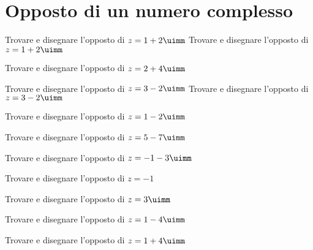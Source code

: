  \section{Opposto di un numero complesso}
 \begin{exercise}
Trovare e disegnare l'opposto di $z=1+2\uimm$
\tcblower
Trovare e disegnare l'opposto di $z=1+2\uimm$
\begin{center}

\label{fig:disegnopianocomplesso03}
\end{center}
 \end{exercise}
 \begin{exercise}[no solution]
 Trovare e disegnare l'opposto di $z=2+4\uimm$
 \end{exercise}
  \begin{exercise}
  Trovare e disegnare l'opposto di $z=3-2\uimm$
  	\tcblower
  	 Trovare e disegnare l'opposto di $z=3-2\uimm$
  	\begin{center}
  		
  		\label{fig:disegnopianocomplesso04}
  	\end{center}
  \end{exercise}
 \begin{exercise}[no solution]
 	Trovare e disegnare l'opposto di $z=1-2\uimm$
 \end{exercise}
\begin{exercise}[no solution]
	Trovare e disegnare l'opposto di  $z=5-7\uimm$
\end{exercise}
\begin{exercise}[no solution]
	Trovare e disegnare l'opposto di  $z=-1-3\uimm$
\end{exercise}
\begin{exercise}[no solution]
	Trovare e disegnare l'opposto di  $z=-1$
\end{exercise}
\begin{exercise}[no solution]
	Trovare e disegnare l'opposto di  $z=3\uimm$
\end{exercise}
\begin{exercise}[no solution]
	Trovare e disegnare l'opposto di  $z=1-4\uimm$
\end{exercise}
\begin{exercise}[no solution]
	Trovare e disegnare l'opposto di  $z=1+4\uimm$
\end{exercise}
